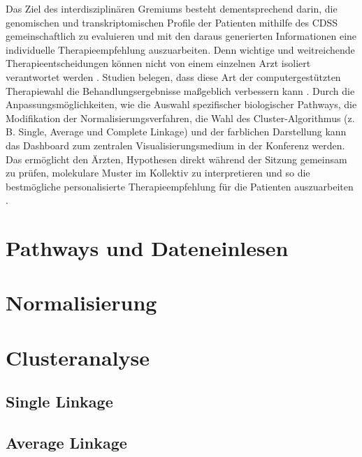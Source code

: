 \documentclass[12pt]{article}
\begin{document}
Das Ziel des interdisziplinären Gremiums besteht dementsprechend darin, die genomischen und transkriptomischen Profile der Patienten mithilfe des CDSS gemeinschaftlich zu evaluieren und mit den daraus generierten Informationen eine individuelle Therapieempfehlung auszuarbeiten. Denn wichtige und weitreichende Therapieentscheidungen können nicht von einem einzelnen Arzt isoliert verantwortet werden \cite{Mosele2020}. Studien belegen, dass diese Art der computergestützten Therapiewahl die Behandlungsergebnisse maßgeblich verbessern kann \cite{Horak2021}. Durch die Anpassungsmöglichkeiten, wie die Auswahl spezifischer biologischer Pathways, die Modifikation der Normalisierungsverfahren, die Wahl des Cluster-Algorithmus (z.\,B. Single, Average und Complete Linkage) und der farblichen Darstellung kann das Dashboard zum zentralen Visualisierungsmedium in der Konferenz werden. Das ermöglicht den Ärzten, Hypothesen direkt während der Sitzung gemeinsam zu prüfen, molekulare Muster im Kollektiv zu interpretieren und so die bestmögliche personalisierte Therapieempfehlung für die Patienten auszuarbeiten \cite{PereraBel2018}.

\newpage
\pagestyle{fancy}
\fancyhead{}
\section{Pathways und Dateneinlesen}
\label{pathways}

\newpage
\pagestyle{fancy}
\fancyhead{}
\section{Normalisierung}
\label{normalisierung}


\section{Clusteranalyse}
\label{clusteranalyse}

\subsection{Single Linkage}
\label{single-linkage}

\subsection{Average Linkage}
\label{average-linkage}
\end{document}
